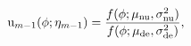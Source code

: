 \begin{equation}
  \text{u}_{m - 1}(\phi; \eta_{m - 1}) = 
  \frac {
    f(\phi; \mu_{\text{nu}}, \sigma^2_{\text{nu}})
  } {
    f(\phi; \mu_{\text{de}}, \sigma^2_{\text{de}})
  },
  \label{eqn:augmentation-definition}
\end{equation}